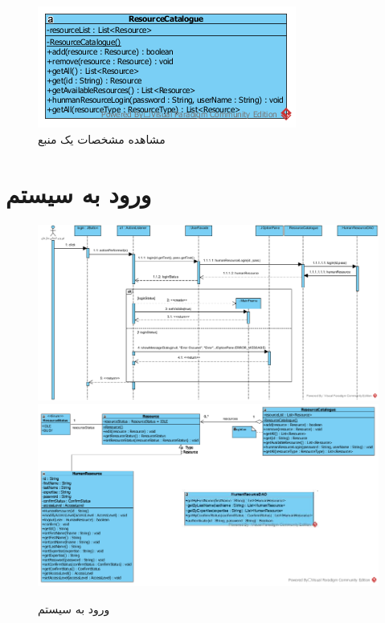 \begin{landscape}
\begin{figure}[H]
\end{figure}
\begin{figure}[H]
	\centering
	\includegraphics[scale=0.7]{img/sequence-design/ViewResourceAttributesC}
	\caption{مشاهده مشخصات یک منبع}
\end{figure}
\end{landscape}

\section{ورود به سیستم}
\begin{figure}[H]
	\centering
	\includegraphics[scale=0.65]{img/sequence-design/SignIn}
	\includegraphics[scale=0.6]{img/sequence-design/SignInCD}
	\caption{ورود به سیستم}
\end{figure}